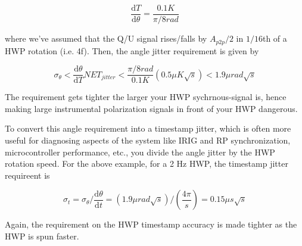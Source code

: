 \begin{equation}
	\frac{\mathrm{d}T}{\mathrm{d}\theta}  = \frac{0.1 K}{\pi/8 rad}
\end{equation}

where we've assumed that the Q/U signal rises/falls by $A_{p2p}/2$ in $1/16$th of a HWP rotation (i.e. 4f). Then, the angle jitter requirement is given by

\begin{equation}
    	\sigma_{\theta} < \frac{\mathrm{d}\theta}{\mathrm{d}T} NET_{jitter} <  \frac{\pi/8 rad}{0.1 K} (0.5 \mu K \sqrt{s}) < 1.9 \mu rad \sqrt{s}
\end{equation}

The requirement gets tighter the larger your HWP sychrnous-signal is, hence making large instrumental polarization signals in front of your HWP dangerous.

To convert this angle requirement into a timestamp jitter, which is often more useful for diagnosing aspects of the system like IRIG and RP synchronization, microcontroller performance, etc., you divide the angle jitter by the HWP rotation speed. For the above example, for a 2 Hz HWP, the timestamp jitter requireent is

\begin{equation}
	\sigma_{t} = \sigma_{\theta} / \frac{\mathrm{d}\theta}{\mathrm{d}{t}} = (1.9 \mu rad \sqrt{s}) / (\frac{4 \pi}{s}) = 0.15 \mu s \sqrt{s}
\end{equation}

Again, the requirement on the HWP timestamp accuracy is made tighter as the HWP is spun faster.
